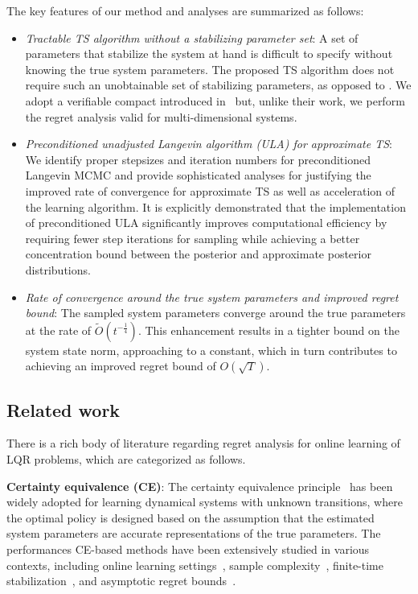 \documentclass[11pt]{article}
\theoremstyle{plain}
\theoremstyle{definition}
\theoremstyle{remark}
\begin{document}
The key features of our method and analyses are summarized as follows:
\begin{itemize}   
\item \textit{Tractable TS algorithm without a stabilizing parameter set}: 
A set of parameters that stabilize the system at hand is difficult to specify without knowing the true system parameters. The proposed TS algorithm 
does not require such an unobtainable set of stabilizing parameters, as opposed to \cite{ouyang2019posterior,gagrani2022modified}.
We adopt a verifiable compact introduced in~\cite{abeille2018improved} but, unlike their work, we perform the regret analysis valid for multi-dimensional systems.

    \item \textit{Preconditioned unadjusted Langevin algorithm (ULA) for approximate TS}:      We identify proper stepsizes and iteration numbers for preconditioned Langevin MCMC and 
 provide sophisticated analyses for justifying the improved rate of convergence for approximate TS as well as acceleration of the learning algorithm.
It is explicitly demonstrated that the implementation of preconditioned ULA significantly improves computational efficiency by requiring fewer step iterations for sampling while achieving a better concentration bound between the posterior and approximate posterior distributions.

    
    \item \textit{Rate of convergence around the true system parameters and improved regret bound}: The sampled system parameters converge around the true parameters at the rate of $\tilde O(t^{-\frac{1}{4}})$. This enhancement results in a tighter bound on the system state norm, approaching to a constant, which in turn contributes to achieving an improved regret bound of $O(\sqrt{T})$.      
\end{itemize}


\subsection{Related work}
There is a rich body of literature regarding regret analysis for online learning of LQR problems, which are categorized as follows.

\textbf{Certainty equivalence (CE)}: 
The certainty equivalence principle~\cite{landau1998adaptive} has been widely adopted for learning dynamical systems with unknown transitions, where the optimal policy is designed based on the assumption that the estimated system parameters are accurate representations of the true parameters. The performances CE-based methods have been extensively studied in various contexts, including online learning settings~\cite{simchowitz2020naive,dean2018regret,mania2019certainty,jedra2022minimal}, sample complexity~\cite{dean2020sample}, finite-time stabilization~\cite{faradonbeh2018finite}, and asymptotic regret bounds~\cite{faradonbeh2020adaptive}. 
\end{document}
